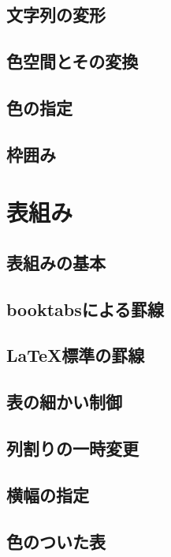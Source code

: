 \documentclass{jsbook}
\begin{document}
\section{文字列の変形}

\section{色空間とその変換}

\section{色の指定}

\section{枠囲み}

\chapter{表組み}

\section{表組みの基本}

\section{booktabsによる罫線}

\section{\LaTeX 標準の罫線}

\section{表の細かい制御}

\section{列割りの一時変更}

\section{横幅の指定}

\section{色のついた表}
\end{document}
